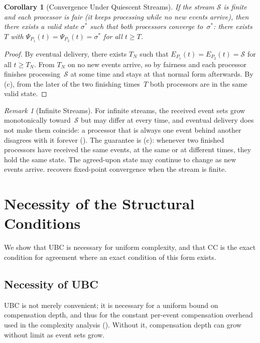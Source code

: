 \documentclass[11pt,a4paper]{article}
\theoremstyle{plain}
\newtheorem{corollary}[theorem]{Corollary}
\theoremstyle{definition}
\theoremstyle{remark}
\newtheorem{remark}[theorem]{Remark}
\begin{document}
\begin{corollary}[Convergence Under Quiescent Streams]
\label{cor:quiescent}
If the stream $\mathcal{S}$ is finite and each processor is fair (it keeps
processing while no new events arrive), then there exists a valid state
$\sigma^*$ such that both processors converge to~$\sigma^*$: there exists $T$
with $\Psi_{P_1}(t) = \Psi_{P_2}(t) = \sigma^*$ for all $t \geq T$.
\end{corollary}
\begin{proof}
By eventual delivery, there exists $T_N$ such that
$E_{P_1}(t) = E_{P_2}(t) = \mathcal{S}$ for all $t \geq T_N$.  From $T_N$ on no
new events arrive, so by fairness and  each processor
finishes processing~$\mathcal{S}$ at some time and stays at that normal form
afterwards.  By (c), from the later of the two finishing
times~$T$ both processors are in the same valid state.
\end{proof}

\begin{remark}[Infinite Streams]
\label{rem:infinite-streams}
For infinite streams, the received event sets grow monotonically
toward~$\mathcal{S}$ but may differ at every time, and eventual delivery does
not make them coincide: a processor that is always one event behind another
disagrees with it forever ().  The guarantee is
(c): whenever two finished processors have received the
same events, at the same or at different times, they hold the same state.
The agreed-upon state may continue to change as new events arrive.
 recovers fixed-point convergence when the stream is
finite.
\end{remark}

\section{Necessity of the Structural Conditions}
\label{sec:necessity}

We show that UBC is necessary for uniform complexity, and that CC is the exact
condition for agreement where an exact condition of this form exists.

\subsection{Necessity of UBC}

UBC is not merely convenient; it is necessary for a uniform bound on
compensation depth, and thus for the constant per-event compensation overhead
used in the complexity analysis ().  Without it,
compensation depth can grow without limit as event sets grow.
\end{document}
